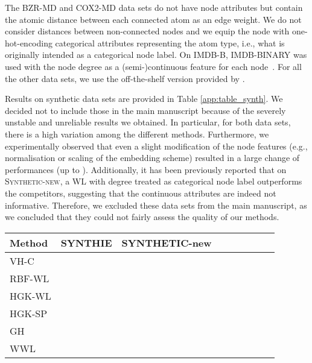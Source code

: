 \documentclass{article}
\begin{document}
The \textsc{BZR-MD} and \textsc{COX2-MD} data sets do not have node attributes but contain the atomic distance between each connected atom as an edge weight. We do not consider distances between non-connected nodes \citep{kriege2012subgraph} and we equip the node with one-hot-encoding categorical attributes representing the atom type, i.e., what is originally intended as a categorical node label. On \textsc{IMDB-B}, \textsc{IMDB-BINARY} was used with the node degree as a \mbox{(semi-)continuous} feature for each node~\citep{yanardag2015deep}. For all the other data sets, we use the off-the-shelf version provided by \citet{repoker2016}.

Results on synthetic data sets are provided in Table \ref{app:table_synth}. We decided not to include those in the main manuscript because of the severely unstable and unreliable results we obtained. In particular, for both data sets, there is a high variation among the different methods. Furthermore, we experimentally observed that even a slight modification of the node features (e.g., normalisation or scaling of the embedding scheme) resulted in a large change of performances (up to ). Additionally, it has been previously reported \citep{morris2016faster,feragen2013scalable} that on \textsc{Synthetic-new}, a WL with degree treated as categorical node label outperforms the competitors, suggesting that the continuous attributes are indeed not informative. Therefore, we excluded these data sets from the main manuscript, as we concluded that they could not fairly assess the quality of our methods.


\begin{table*}[t]
\caption{Classification accuracies on synthetic graphs with continuous node attributes. Comparison of hash graph kernel (HGK-WL, HGK-SP), GraphHopper kernel (GH), and our method (WWL).}
\label{app:table_synth}
\vskip 0.15in
\begin{center}
\begin{small}
\begin{sc}
\setlength{\tabcolsep}{0.5pt}
    \begin{tabular}{lcccccccc}
    \toprule
    Method & SYNTHIE & SYNTHETIC-new \\
    \midrule
    VH-C &  & \\
    RBF-WL &   &  \\
    \midrule
    HGK-WL    &  &    \\
    HGK-SP &  &  \\
    \midrule
    GH  &   &  \\
    \midrule
    WWL   &  & \\
    \bottomrule
    \end{tabular}
\end{sc}
\end{small}
\end{center}
\vskip -0.1in
\end{table*}
\end{document}
